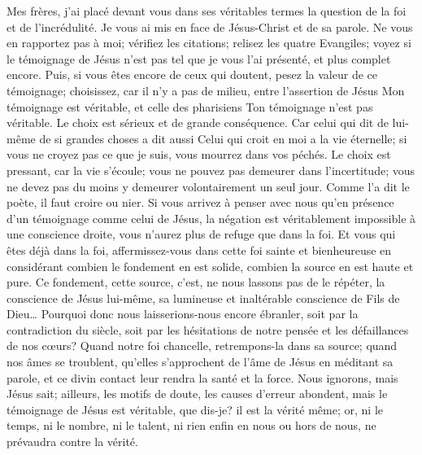 Mes frères, j’ai placé devant vous dans ses véritables termes la question de la foi et de l’incrédulité.
Je vous ai mis en face de Jésus-Christ et de sa parole. Ne vous en rapportez pas à moi; vérifiez les citations;
relisez les quatre Evangiles; voyez si le témoignage de Jésus n’est pas tel que je vous l’ai présenté,
et plus complet encore.
Puis, si vous êtes encore de ceux qui doutent, pesez la valeur de ce témoignage;
choisissez, car il n’y a pas de milieu, entre l’assertion de Jésus\frcolon{}
\Og{} Mon témoignage est véritable\Fg{},
et celle des pharisiens\frcolon{} \Og{} Ton témoignage n’est pas véritable.\Fg{}
Le choix est sérieux et de grande conséquence.
Car celui qui dit de lui-même de si grandes choses a dit aussi\frcolon{}
\Og{} Celui qui croit en moi a la vie éternelle;
si vous ne croyez pas ce que je suis, vous mourrez dans vos péchés.\Fg{}
Le choix est pressant, car la vie s’écoule; vous ne pouvez pas demeurer dans l’incertitude;
vous ne devez pas du moins y demeurer volontairement un seul jour.
Comme l’a dit le poète, il faut croire ou nier.
Si vous arrivez à penser avec nous qu’en présence d’un témoignage comme celui de Jésus,
la négation est véritablement impossible à une conscience droite, vous n’aurez plus de refuge que dans la foi.
Et vous qui êtes déjà dans la foi, affermissez-vous dans cette foi sainte et bienheureuse en considérant combien le fondement en est solide,
combien la source en est haute et pure.
Ce fondement, cette source, c’est, ne nous lassons pas de le répéter, la conscience de Jésus lui-même,
sa lumineuse et inaltérable conscience de Fils de Dieu…
Pourquoi donc nous laisserions-nous encore ébranler, soit par la contradiction du siècle,
soit par les hésitations de notre pensée et les défaillances de nos cœurs?
Quand notre foi chancelle, retrempons-la dans sa source; quand nos âmes se troublent, qu’elles s’approchent de l’âme de Jésus
en méditant sa parole, et ce divin contact leur rendra la santé et la force.
Nous ignorons, mais Jésus sait; ailleurs, les motifs de doute, les causes d’erreur abondent,
mais le témoignage de Jésus est véritable, que dis-je? il est la vérité même; or, ni le temps, ni le nombre, ni le talent,
ni rien enfin en nous ou hors de nous, ne prévaudra contre la vérité.

